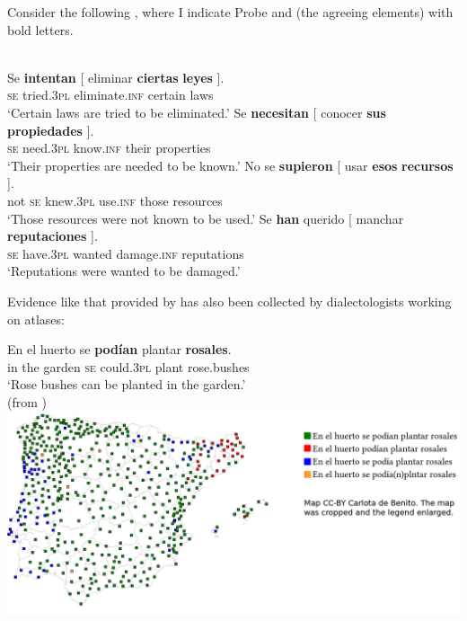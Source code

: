 \documentclass[output=paper]{langsci/langscibook}
\begin{document}
Consider the following \citep[Chapter~28]{RAE-ASALE2009}, where I indicate Probe and  (the agreeing elements) with bold letters.

\ea%
    \label{ex:gallego:9}\\
    \ea
    \gll Se  \textbf{intentan}  [ eliminar        \textbf{ciertas}  \textbf{leyes} ].        \\
         \textsc{se} tried\textsc{{}.3pl} {}  eliminate.\textsc{inf}  certain   laws\\
    \glt ‘Certain laws are tried to be eliminated.’  
    \ex
    \gll Se  \textbf{necesitan}  [ conocer     \textbf{sus}    \textbf{propiedades} ].         \\
            \textsc{se}  need\textsc{{}.3pl} {}  know.\textsc{inf}   their  properties\\
    \glt    ‘Their properties are needed to be known.’
    \ex
    \gll No se   \textbf{supieron}  [ usar        \textbf{esos}    \textbf{recursos} ].        \\
            not \textsc{se} knew\textsc{{}.3pl} {}   use.\textsc{inf}   those   resources\\
    \glt    ‘Those resources were not known to be used.’
    \ex
    \gll  Se   \textbf{han}           querido [ manchar        \textbf{reputaciones} ].     \\
            \textsc{se} have\textsc{{}.3pl} wanted {}   damage.\textsc{inf}   reputations\\
    \glt     ‘Reputations were wanted to be damaged.’
    \z
\z

Evidence like that provided by \citet{RAE-ASALE2009} has also been collected by dialectologists working on atlases:

\ea%
\gll En el huerto se \textbf{podían} plantar \textbf{rosales}.\\
in the garden \textsc{se} could.\textsc{3pl} plant rose.bushes\\
\glt ‘Rose bushes can be planted in the garden.’\\
(from \citealt[13]{Benito2010}) \\
     \includegraphics[width=\linewidth]{figures/rosales.png}
\z
\end{document}

